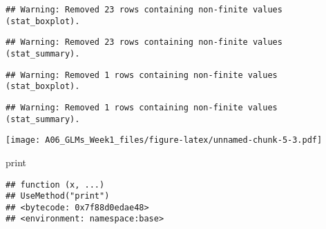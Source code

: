 \documentclass[]{article}
\newenvironment{Shaded}{\begin{snugshade}}{\end{snugshade}}
\newcommand{\CommentTok}[1]{\textcolor[rgb]{0.56,0.35,0.01}{\textit{#1}}}
\newcommand{\DataTypeTok}[1]{\textcolor[rgb]{0.13,0.29,0.53}{#1}}
\newcommand{\DecValTok}[1]{\textcolor[rgb]{0.00,0.00,0.81}{#1}}
\newcommand{\FloatTok}[1]{\textcolor[rgb]{0.00,0.00,0.81}{#1}}
\newcommand{\KeywordTok}[1]{\textcolor[rgb]{0.13,0.29,0.53}{\textbf{#1}}}
\newcommand{\NormalTok}[1]{#1}
\newcommand{\OperatorTok}[1]{\textcolor[rgb]{0.81,0.36,0.00}{\textbf{#1}}}
\newcommand{\StringTok}[1]{\textcolor[rgb]{0.31,0.60,0.02}{#1}}
\begin{document}
\begin{Shaded}
\end{Shaded}

\begin{verbatim}
## Warning: Removed 23 rows containing non-finite values (stat_boxplot).
\end{verbatim}

\begin{verbatim}
## Warning: Removed 23 rows containing non-finite values (stat_summary).
\end{verbatim}

\begin{verbatim}
## Warning: Removed 1 rows containing non-finite values (stat_boxplot).
\end{verbatim}

\begin{verbatim}
## Warning: Removed 1 rows containing non-finite values (stat_summary).
\end{verbatim}

\texttt{[image: A06\_GLMs\_Week1\_files/figure-latex/unnamed-chunk-5-3.pdf]}

\begin{Shaded}
\begin{Highlighting}[]
\NormalTok{print}
\end{Highlighting}
\end{Shaded}

\begin{verbatim}
## function (x, ...) 
## UseMethod("print")
## <bytecode: 0x7f88d0edae48>
## <environment: namespace:base>
\end{verbatim}
\end{document}
